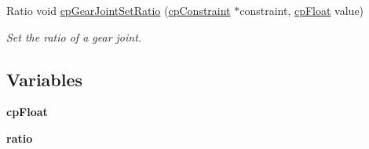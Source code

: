 \begin{DoxyCompactItemize}
\item 
\hypertarget{group__cp_gear_joint_ga6721ba90a010b097462cd6ad29fb8472}{Ratio void \hyperlink{group__cp_gear_joint_ga6721ba90a010b097462cd6ad29fb8472}{cp\-Gear\-Joint\-Set\-Ratio} (\hyperlink{structcp_constraint}{cp\-Constraint} $\ast$constraint, \hyperlink{group__basic_types_gac1ed65573e035bf892505768c852d8d3}{cp\-Float} value)}\label{group__cp_gear_joint_ga6721ba90a010b097462cd6ad29fb8472}

\begin{DoxyCompactList}\small\item\em Set the ratio of a gear joint. \end{DoxyCompactList}\end{DoxyCompactItemize}
\subsection*{Variables}
\begin{DoxyCompactItemize}
\item 
\hypertarget{group__cp_gear_joint_ga771844b3ae466da0613e76d364d00bd3}{{\bfseries cp\-Float}}\label{group__cp_gear_joint_ga771844b3ae466da0613e76d364d00bd3}

\item 
\hypertarget{group__cp_gear_joint_ga33e97a0953b4f4a9f1b61cd9556e2350}{{\bfseries ratio}}\label{group__cp_gear_joint_ga33e97a0953b4f4a9f1b61cd9556e2350}

\end{DoxyCompactItemize}
